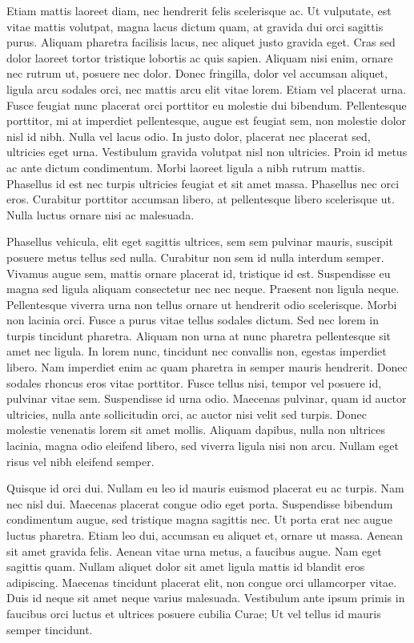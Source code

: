 Etiam mattis laoreet diam, nec hendrerit felis scelerisque ac.
Ut vulputate, est vitae mattis volutpat, magna lacus dictum quam, at gravida dui orci sagittis purus.
Aliquam pharetra facilisis lacus, nec aliquet justo gravida eget.
Cras sed dolor laoreet tortor tristique lobortis ac quis sapien.
Aliquam nisi enim, ornare nec rutrum ut, posuere nec dolor.
Donec fringilla, dolor vel accumsan aliquet, ligula arcu sodales orci, nec mattis arcu elit vitae lorem.
Etiam vel placerat urna.
Fusce feugiat nunc placerat orci porttitor eu molestie dui bibendum.
Pellentesque porttitor, mi at imperdiet pellentesque, augue est feugiat sem, non molestie dolor nisl id nibh.
Nulla vel lacus odio.
In justo dolor, placerat nec placerat sed, ultricies eget urna.
Vestibulum gravida volutpat nisl non ultricies.
Proin id metus ac ante dictum condimentum.
Morbi laoreet ligula a nibh rutrum mattis.
Phasellus id est nec turpis ultricies feugiat et sit amet massa.
Phasellus nec orci eros.
Curabitur porttitor accumsan libero, at pellentesque libero scelerisque ut.
Nulla luctus ornare nisi ac malesuada.

Phasellus vehicula, elit eget sagittis ultrices, sem sem pulvinar mauris, suscipit posuere metus tellus sed nulla.
Curabitur non sem id nulla interdum semper.
Vivamus augue sem, mattis ornare placerat id, tristique id est.
Suspendisse eu magna sed ligula aliquam consectetur nec nec neque.
Praesent non ligula neque.
Pellentesque viverra urna non tellus ornare ut hendrerit odio scelerisque.
Morbi non lacinia orci.
Fusce a purus vitae tellus sodales dictum.
Sed nec lorem in turpis tincidunt pharetra.
Aliquam non urna at nunc pharetra pellentesque sit amet nec ligula.
In lorem nunc, tincidunt nec convallis non, egestas imperdiet libero.
Nam imperdiet enim ac quam pharetra in semper mauris hendrerit.
Donec sodales rhoncus eros vitae porttitor.
Fusce tellus nisi, tempor vel posuere id, pulvinar vitae sem.
Suspendisse id urna odio.
Maecenas pulvinar, quam id auctor ultricies, nulla ante sollicitudin orci, ac auctor nisi velit sed turpis.
Donec molestie venenatis lorem sit amet mollis.
Aliquam dapibus, nulla non ultrices lacinia, magna odio eleifend libero, sed viverra ligula nisi non arcu.
Nullam eget risus vel nibh eleifend semper.

Quisque id orci dui.
Nullam eu leo id mauris euismod placerat eu ac turpis.
Nam nec nisl dui.
Maecenas placerat congue odio eget porta.
Suspendisse bibendum condimentum augue, sed tristique magna sagittis nec.
Ut porta erat nec augue luctus pharetra.
Etiam leo dui, accumsan eu aliquet et, ornare ut massa.
Aenean sit amet gravida felis.
Aenean vitae urna metus, a faucibus augue.
Nam eget sagittis quam.
Nullam aliquet dolor sit amet ligula mattis id blandit eros adipiscing.
Maecenas tincidunt placerat elit, non congue orci ullamcorper vitae.
Duis id neque sit amet neque varius malesuada.
Vestibulum ante ipsum primis in faucibus orci luctus et ultrices posuere cubilia Curae; Ut vel tellus id mauris semper tincidunt.

